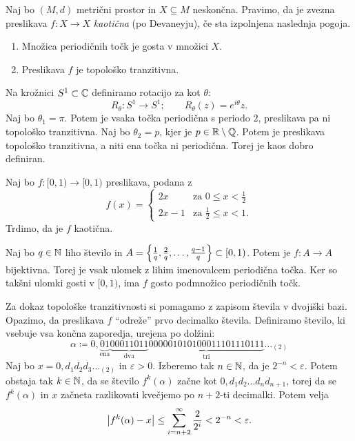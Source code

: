 \begin{definicija}
    Naj bo \((M, d)\) metrični prostor in \(X \subseteq M\) neskončna. Pravimo, da je zvezna preslikava \(f \colon X \to X\) \emph{kaotična} (po Devaneyju), če sta izpolnjena naslednja pogoja.
    \begin{enumerate}
        \item Množica periodičnih točk je gosta v množici \(X\).
        \item Preslikava \(f\) je topološko tranzitivna.
    \end{enumerate}
\end{definicija}

\begin{zgled}
    Na krožnici \(S^1 \subset \mathbb C\) definiramo rotacijo za kot \(\theta\):
    \[R_\theta \colon S^1 \to S^1; \qquad R_\theta (z) = e^{i \theta} z.\]
    Naj bo \(\theta_1 = \pi\). Potem je vsaka točka periodična s periodo \(\num{2}\), preslikava pa ni topološko  tranzitivna. Naj bo \(\theta_2 = p\), kjer je \(p \in \mathbb R \setminus \mathbb Q\). Potem je preslikava topološko tranzitivna, a niti ena točka ni periodična. Torej je kaos dobro definiran.
\end{zgled}

\begin{zgled}
    Naj bo \(f \colon [0, 1) \to [0, 1)\) preslikava, podana z
    \[
        f (x) =
        \begin{cases}
            2x & \text{za } 0 \leq x < \frac{1}{2}\\
            2x - 1 & \text{za } \frac{1}{2} \leq x < 1.
        \end{cases}
    \]
    Trdimo, da je \(f\) kaotična.

    Naj bo \(q \in \mathbb N\) liho število in \(A = \left\{ \frac{1}{q}, \frac{2}{q}, \dots, \frac{q - 1}{q} \right\} \subset [0, 1)\). Potem je \(f \colon A \to A\) bijektivna. Torej je vsak ulomek z lihim imenovalcem periodična točka. Ker so takšni ulomki gosti v \([0, 1)\), ima \(f\) gosto podmnožico periodičnih točk.

    Za dokaz topološke tranzitivnosti si pomagamo z zapisom števila v dvojiški bazi. Opazimo, da preslikava \(f\) ``odreže'' prvo decimalko števila. Definiramo število, ki vsebuje vsa končna zaporedja, urejena po dolžini:
    \[\alpha \coloneq 0, \underbrace{0 1}_{\text{ena}} \underbrace{00011011}_{\text{dva}} \underbrace{000 001 010 100 011 101 110 111}_{\text{tri}} \dots_{(2)}\]
    Naj bo \(x = 0, d_1 d_2 d_3 \dots_{(2)}\) in \(\varepsilon > 0\). Izberemo tak \(n \in \mathbb N\), da je \(2^{- n} < \varepsilon\). Potem obstaja tak \(k \in \mathbb N\), da se število \(f^k (\alpha)\) začne kot \(0, d_1 d_2 \dots d_n d_{n + 1}\), torej da se \(f^k (\alpha)\) in \(x\) začneta razlikovati kvečjemo po \(n + 2\)-ti decimalki. Potem velja
    \[\left\lvert f^k (\alpha) - x\right\rvert \leq \sum_{i = n + 2}^{\infty} \frac{2}{2^{i}} < 2^{- n} < \varepsilon.\]
\end{zgled}

